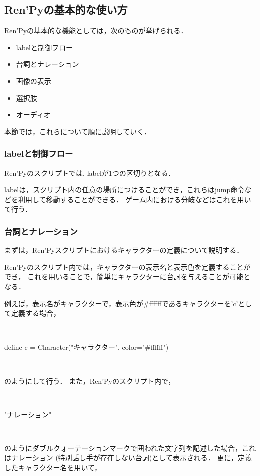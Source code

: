 \subsection{Ren'Pyの基本的な使い方}
  
  Ren'Pyの基本的な機能としては，次のものが挙げられる．

  \begin{itemize}
    \item labelと制御フロー
    \item 台詞とナレーション
    \item 画像の表示
    \item 選択肢
    \item オーディオ
  \end{itemize}

  本節では，これらについて順に説明していく．

  \subsubsection{labelと制御フロー}

    Ren'Pyのスクリプトでは, labelが1つの区切りとなる．
    
    labelは，スクリプト内の任意の場所につけることができ，これらはjump命令などを利用して移動することができる．
    ゲーム内における分岐などはこれを用いて行う．

  \subsubsection{台詞とナレーション}

    まずは，Ren'Pyスクリプトにおけるキャラクターの定義について説明する．

    Ren'Pyのスクリプト内では，キャラクターの表示名と表示色を定義することができ，
    これを用いることで，簡単にキャラクターに台詞を与えることが可能となる．

    例えば，表示名がキャラクターで，表示色が\#ffffffであるキャラクターを'c'として定義する場合，

    ~

    define c = Character("キャラクター", color="\#ffffff")

    ~

    のようにして行う．
    また，Ren'Pyのスクリプト内で，

    ~

    "ナレーション"

    ~

    のようにダブルクォーテーションマークで囲われた文字列を記述した場合，これはナレーション
    (特別話し手が存在しない台詞)として表示される．
    更に，定義したキャラクター名を用いて，

